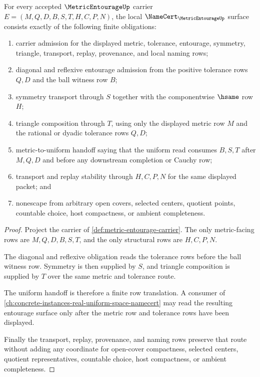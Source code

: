 \begin{theorem}
\label{thm:metric-entourage-namecert-obligations}
For every accepted $\MetricEntourageUp$ carrier $E=(M,Q,D,B,S,T,H,C,P,N)$, the local $\NameCert_{\MetricEntourageUp}$ surface consists exactly of the following finite obligations:
\begin{enumerate}
\item carrier admission for the displayed metric, tolerance, entourage, symmetry, triangle, transport, replay, provenance, and local naming rows;
\item diagonal and reflexive entourage admission from the positive tolerance rows $Q,D$ and the ball witness row $B$;
\item symmetry transport through $S$ together with the componentwise $\hsame$ row $H$;
\item triangle composition through $T$, using only the displayed metric row $M$ and the rational or dyadic tolerance rows $Q,D$;
\item metric-to-uniform handoff saying that the uniform read consumes $B,S,T$ after $M,Q,D$ and before any downstream completion or Cauchy row;
\item transport and replay stability through $H,C,P,N$ for the same displayed packet; and
\item nonescape from arbitrary open covers, selected centers, quotient points, countable choice, host compactness, or ambient completeness.
\end{enumerate}
\end{theorem}
\begin{proof}
Project the carrier of \autoref{def:metric-entourage-carrier}. The only metric-facing rows are $M,Q,D,B,S,T$, and the only structural rows are $H,C,P,N$.

The diagonal and reflexive obligation reads the tolerance rows before the ball witness row. Symmetry is then supplied by $S$, and triangle composition is supplied by $T$ over the same metric and tolerance route.

The uniform handoff is therefore a finite row translation. A consumer of \autoref{ch:concrete-instances-real-uniform-space-namecert} may read the resulting entourage surface only after the metric row and tolerance rows have been displayed.

Finally the transport, replay, provenance, and naming rows preserve that route without adding any coordinate for open-cover compactness, selected centers, quotient representatives, countable choice, host compactness, or ambient completeness.
\end{proof}

